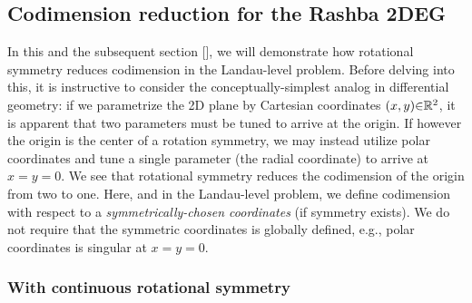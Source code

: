 \documentclass[aps, prb, showpacs, twocolumn, notitlepage, superscriptaddress]{revtex4-1}
\begin{document}



\subsection{Codimension reduction for the Rashba 2DEG}


In this and the subsequent section [], we will demonstrate how rotational symmetry reduces codimension in the Landau-level problem. Before delving into this, it is instructive to consider the conceptually-simplest analog in differential geometry: if we parametrize the 2D plane by Cartesian coordinates $(x,y){\in}\mathbb{R}^2$, it is apparent that two parameters must be tuned to arrive at the origin. If however the origin is the center of a rotation symmetry, we may instead utilize polar coordinates and tune a single parameter (the radial coordinate) to arrive at $x{=}y{=}0$. We see that rotational symmetry reduces the codimension of the origin from two to one. Here, and in the  Landau-level problem, we define codimension with respect to a \textit{symmetrically-chosen coordinates} (if symmetry exists). We do not require that the symmetric coordinates is globally defined, e.g., polar coordinates is singular at $x{=}y{=}0$.


\subsubsection{With continuous rotational symmetry}

\end{document}
